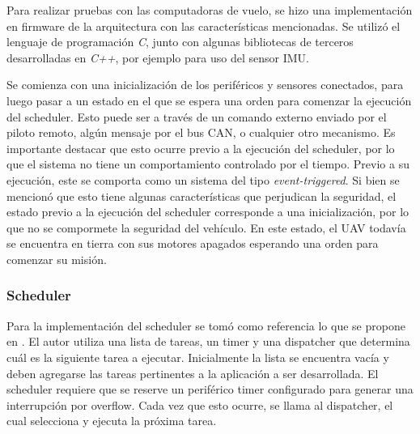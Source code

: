 
Para realizar pruebas con las computadoras de vuelo, se hizo una implementación en firmware de la arquitectura con las características mencionadas. Se utilizó el lenguaje de programación \textit{C}, junto con algunas bibliotecas de terceros desarrolladas en \textit{C++}, por ejemplo para uso del sensor IMU. 


Se comienza con una inicialización de los periféricos y sensores conectados, para luego pasar a un estado en el que se espera una orden para comenzar la ejecución del scheduler. Esto puede ser a través de un comando externo enviado por el piloto remoto, algún mensaje por el bus CAN, o cualquier otro mecanismo.
Es importante destacar que esto ocurre previo a la ejecución del scheduler, por lo que el sistema no tiene un comportamiento controlado por el tiempo. Previo a su ejecución, este se comporta como un sistema del tipo \textit{event-triggered}. Si bien se mencionó que esto tiene algunas características que perjudican la seguridad, el estado previo a la ejecución del scheduler corresponde a una inicialización, por lo que no se compormete la seguridad del vehículo. En este estado, el UAV todavía se encuentra en tierra con sus motores apagados esperando una orden para comenzar su misión.

\subsubsection{Scheduler}


Para la implementación del scheduler se tomó como referencia lo que se propone en \cite{pont2008patterns}. El autor utiliza una lista de tareas, un timer y una dispatcher que determina cuál es la siguiente tarea a ejecutar. Inicialmente la lista se encuentra vacía y deben agregarse las tareas pertinentes a la aplicación a ser desarrollada. El scheduler requiere que se reserve un periférico timer configurado para generar una interrupción por overflow. Cada vez que esto ocurre, se llama al dispatcher, el cual selecciona y ejecuta la próxima tarea.

